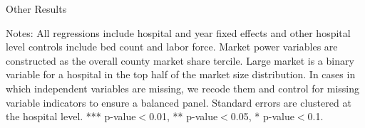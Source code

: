 \documentclass[12pt]{article}
\begin{document}
\newpage
{}
\setlength{\captionmargin}{.5 \textwidth} \addtolength{\captionmargin}{-.5\wd\gfxbox}
\begin{table}[htbp!]
\centering
\caption{Other Results}
\label{tab:other_results}
\usebox{\gfxbox}
\par
\begin{minipage}{\wd\gfxbox}
\footnotesize
Notes: All regressions include hospital and year fixed effects and other hospital level controls include bed count and labor force.  Market power variables are constructed as the overall county market share tercile.  Large market is a binary variable for a hospital in the top half of the market size distribution.  In cases in which independent variables are missing, we recode them and control for missing variable indicators to ensure a balanced panel.  Standard errors are clustered at the hospital level.  *** p-value$<$0.01, ** p-value$<$0.05, * p-value$<$0.1.
\end{minipage}
\end{table}
\end{document}
